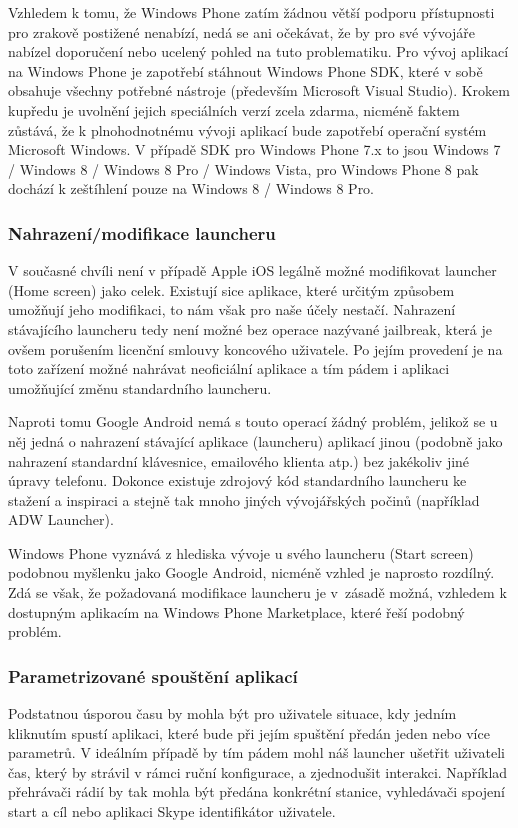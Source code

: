 \documentclass[thesis=M,czech]{FITthesis}[2012/06/26]
\begin{document}
Vzhledem k tomu, že Windows Phone zatím žádnou větší podporu přístupnosti pro zrakově postižené nenabízí, nedá se ani očekávat, že by pro své vývojáře nabízel doporučení nebo ucelený pohled na tuto problematiku. Pro vývoj aplikací na Windows Phone je zapotřebí stáhnout Windows Phone SDK\cite{win_sdk}, které v sobě obsahuje všechny potřebné nástroje\cite{win8_sdk} (především Microsoft Visual Studio). Krokem kupředu je uvolnění jejich speciálních verzí zcela zdarma, nicméně faktem zůstává, že k plnohodnotnému vývoji aplikací bude zapotřebí operační systém Microsoft Windows. V případě SDK pro Windows Phone 7.x to jsou Windows 7 / Windows 8 / Windows 8 Pro / Windows Vista, pro Windows Phone 8 pak dochází k zeštíhlení pouze na Windows 8 / Windows 8 Pro.

\subsubsection*{Nahrazení/modifikace launcheru}
V současné chvíli není v případě Apple iOS legálně možné modifikovat launcher (Home screen) jako celek. Existují sice aplikace, které určitým způsobem umožňují jeho modifikaci\cite{iphone_shortcuts}, to nám však pro naše účely nestačí. Nahrazení stávajícího launcheru tedy není možné bez operace nazývané jailbreak\cite{ios_jailbreak}, která je ovšem porušením licenční smlouvy koncového uživatele\cite{apple_about_jailbreak}. Po jejím provedení je na toto zařízení možné nahrávat neoficiální aplikace a tím pádem i aplikaci umožňující změnu standardního launcheru\cite{iphone_launcher}.

Naproti tomu Google Android nemá s touto operací žádný problém, jelikož se u něj jedná o nahrazení stávající aplikace (launcheru) aplikací jinou (podobně jako nahrazení standardní klávesnice, emailového klienta atp.) bez jakékoliv jiné úpravy telefonu. Dokonce existuje zdrojový kód standardního launcheru ke stažení a inspiraci\cite{android_launcher} a stejně tak mnoho jiných vývojářských počinů (například ADW Launcher\cite{android_adw_launcher}).

Windows Phone vyznává z hlediska vývoje u svého launcheru (Start screen) podobnou myšlenku jako Google Android, nicméně vzhled je naprosto rozdílný. Zdá se však, že požadovaná modifikace launcheru je v~zásadě možná, vzhledem k dostupným aplikacím na Windows Phone Marketplace, které řeší podobný problém\cite{win_launcher}\cite{win_launcher2}.

\subsubsection*{Parametrizované spouštění aplikací}
Podstatnou úsporou času by mohla být pro uživatele situace, kdy jedním kliknutím spustí aplikaci, které bude při jejím spuštění předán jeden nebo více parametrů. V ideálním případě by tím pádem mohl náš launcher ušetřit uživateli čas, který by strávil v rámci ruční konfigurace, a zjednodušit interakci. Například přehrávači rádií by tak mohla být předána konkrétní stanice, vyhledávači spojení start a cíl nebo aplikaci Skype identifikátor uživatele.
\end{document}

